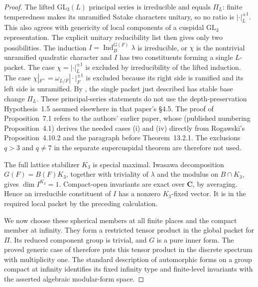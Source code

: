 \documentclass[11pt,a4paper]{article}
\theoremstyle{definition}
\begin{document}
\begin{proof}
The lifted $\mathrm{GL}_3(L)$ principal series is irreducible and equals
$\Pi_L$: finite temperedness makes its unramified Satake characters
unitary, so no ratio is $|\cdot|_L^{\pm1}$. This also agrees with
genericity of local components of a cuspidal $\mathrm{GL}_3$ representation.
The explicit unitary reducibility list
\cite[\S4.4, pp.~14--15]{K17AdlerLansky2010}
then gives only two possibilities. The induction
$I=\operatorname{Ind}_B^{G(F)}\lambda$ is irreducible, or $\chi$ is the
nontrivial unramified quadratic character and $I$ has two constituents
forming a single $L$-packet. The case $\chi=|\cdot|_L^{\pm1}$ is
excluded by irreducibility of the lifted induction. The case
$\chi|_{F^\times}=\omega_{L/F}|\cdot|_F^{\pm1}$ is excluded because
its right side is ramified and its left side is unramified.
By \cite[Proposition~6.1(1),(4), p.~21, and
Proposition~7.1(i),(iv), p.~28]{K17AdlerLansky2010}, the single packet
just described has stable base change $\Pi_L$.
These principal-series statements do not use the depth-preservation
Hypothesis~1.5 assumed elsewhere in that paper's \S4.5. The proof of
Proposition~7.1 refers to the authors' earlier paper, whose
\cite[Proposition~5.1 and complete proof, pp.~19--20]{K17AdlerLanskyUnram}
(published numbering Proposition~4.1) derives the needed cases (i) and (iv)
directly from Rogawski's Proposition~4.10.2 and the paragraph before
Theorem~13.2.1. The exclusions $q>3$ and $q\ne7$ in the separate
supercuspidal theorem are therefore not used.

The full lattice stabilizer $K_3$ is special maximal. Iwasawa decomposition
$G(F)=B(F)K_3$, together with triviality of $\lambda$ and the modulus on
$B\cap K_3$, gives $\dim I^{K_3}=1$. Compact-open invariants are exact
over $\mathbf C$, by averaging. Hence an irreducible constituent of $I$
has a nonzero $K_3$-fixed vector. It is in the required local packet by the
preceding calculation.

We now choose these spherical members at all finite places and the compact
member at infinity. They form a restricted tensor product in the global
packet for $\Pi$. Its reduced component group is trivial, and $G$ is a
pure inner form. The proved generic case of
\cite[Theorem~5.0.5]{K17KMSW2014} therefore puts this tensor product in
the discrete spectrum with multiplicity one. The standard description of
automorphic forms on a group compact at infinity identifies its fixed
infinity type and finite-level invariants with the asserted algebraic
modular-form space.
\end{proof}
\end{document}
